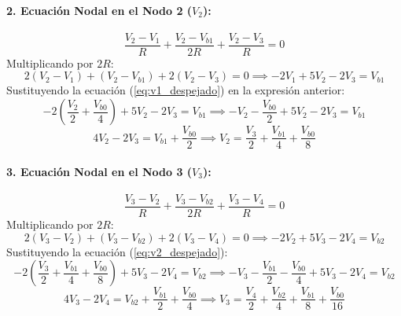 \documentclass[11pt,letterpaper]{article}
\begin{document}
\paragraph{2. Ecuación Nodal en el Nodo 2 ($V_2$):}
\begin{equation}
\frac{V_2 - V_1}{R} + \frac{V_2 - V_{b1}}{2R} + \frac{V_2 - V_3}{R} = 0
\label{eq:lck_nodo2}
\end{equation}
Multiplicando por $2R$:
\begin{equation}
2(V_2 - V_1) + (V_2 - V_{b1}) + 2(V_2 - V_3) = 0 \implies -2V_1 + 5V_2 - 2V_3 = V_{b1}
\end{equation}
Sustituyendo la ecuación (\ref{eq:v1_despejado}) en la expresión anterior:
\begin{equation}
-2\left( \frac{V_2}{2} + \frac{V_{b0}}{4} \right) + 5V_2 - 2V_3 = V_{b1} \implies -V_2 - \frac{V_{b0}}{2} + 5V_2 - 2V_3 = V_{b1}
\end{equation}
\begin{equation}
4V_2 - 2V_3 = V_{b1} + \frac{V_{b0}}{2} \implies V_2 = \frac{V_3}{2} + \frac{V_{b1}}{4} + \frac{V_{b0}}{8} \label{eq:v2_despejado}
\end{equation}

\paragraph{3. Ecuación Nodal en el Nodo 3 ($V_3$):}
\begin{equation}
\frac{V_3 - V_2}{R} + \frac{V_3 - V_{b2}}{2R} + \frac{V_3 - V_4}{R} = 0
\label{eq:lck_nodo3}
\end{equation}
Multiplicando por $2R$:
\begin{equation}
2(V_3 - V_2) + (V_3 - V_{b2}) + 2(V_3 - V_4) = 0 \implies -2V_2 + 5V_3 - 2V_4 = V_{b2}
\end{equation}
Sustituyendo la ecuación (\ref{eq:v2_despejado}):
\begin{equation}
-2\left( \frac{V_3}{2} + \frac{V_{b1}}{4} + \frac{V_{b0}}{8} \right) + 5V_3 - 2V_4 = V_{b2} \implies -V_3 - \frac{V_{b1}}{2} - \frac{V_{b0}}{4} + 5V_3 - 2V_4 = V_{b2}
\end{equation}
\begin{equation}
4V_3 - 2V_4 = V_{b2} + \frac{V_{b1}}{2} + \frac{V_{b0}}{4} \implies V_3 = \frac{V_4}{2} + \frac{V_{b2}}{4} + \frac{V_{b1}}{8} + \frac{V_{b0}}{16} \label{eq:v3_despejado}
\end{equation}
\end{document}
